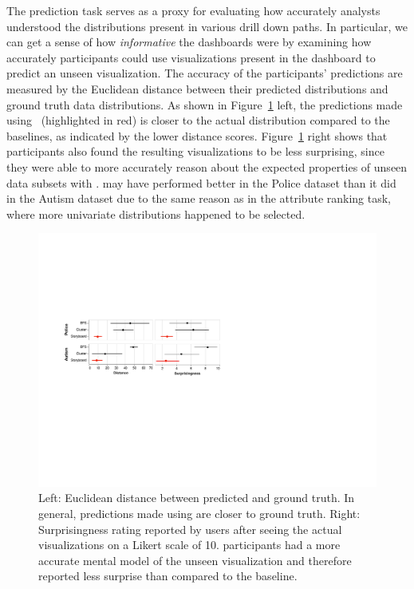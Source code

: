  The prediction task serves as a proxy for evaluating how accurately analysts understood the distributions present in various drill down paths. In particular, we can get a sense of how \emph{informative} the dashboards were by examining how accurately participants could use visualizations present in the dashboard to predict an unseen visualization. The accuracy of the participants' predictions are measured by the Euclidean distance between their predicted distributions and ground truth data distributions. As shown in Figure~\ref{fig:distance} left, the predictions made using \system\ (highlighted in red) is closer to the actual distribution compared to the baselines, as indicated by the lower distance scores. Figure~\ref{fig:distance} right shows that \system participants also found the resulting visualizations to be less surprising, since they were able to more accurately reason about the expected properties of unseen data subsets with \system. \cluster may have performed better in the Police dataset than it did in the Autism dataset due to the same reason as in the attribute ranking task, where more univariate distributions happened to be selected.
\begin{figure}[h!]
\centering
\includegraphics[width=\linewidth]{figures/prediction_surprisingness_distance.pdf}
\caption{Left: Euclidean distance between predicted and ground truth. In general, predictions made using \system are closer to ground truth. Right: Surprisingness rating reported by users after seeing the actual visualizations on a Likert scale of 10. \system participants had a more accurate mental model of the unseen visualization and therefore reported less surprise than compared to the baseline.}
\label{fig:distance}
\end{figure}
